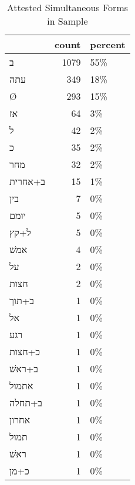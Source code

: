 \begin{table}[htbp!]
\centering
\caption{Attested Simultaneous Forms in Sample}
\label{table:sim_front}
\begin{tabular}{lrl}
\toprule
{} &  count & percent \\
\midrule
\texthebrew{ב}       &   1079 &     55\% \\
\texthebrew{עתה}     &    349 &     18\% \\
\texthebrew{Ø}       &    293 &     15\% \\
\texthebrew{אז}      &     64 &      3\% \\
\texthebrew{ל}       &     42 &      2\% \\
\texthebrew{כ}       &     35 &      2\% \\
\texthebrew{מחר}     &     32 &      2\% \\
\texthebrew{ב+אחרית} &     15 &      1\% \\
\texthebrew{בין}     &      7 &      0\% \\
\texthebrew{יומם}    &      5 &      0\% \\
\texthebrew{ל+קץ}    &      5 &      0\% \\
\texthebrew{אמשׁ}    &      4 &      0\% \\
\texthebrew{על}      &      2 &      0\% \\
\texthebrew{חצות}    &      2 &      0\% \\
\texthebrew{ב+תוך}   &      1 &      0\% \\
\texthebrew{אל}      &      1 &      0\% \\
\texthebrew{רגע}     &      1 &      0\% \\
\texthebrew{כ+חצות}  &      1 &      0\% \\
\texthebrew{ב+ראשׁ}  &      1 &      0\% \\
\texthebrew{אתמול}   &      1 &      0\% \\
\texthebrew{ב+תחלה}  &      1 &      0\% \\
\texthebrew{אחרון}   &      1 &      0\% \\
\texthebrew{תמול}    &      1 &      0\% \\
\texthebrew{ראשׁ}    &      1 &      0\% \\
\texthebrew{כ+מן}    &      1 &      0\% \\
\bottomrule
\end{tabular}
\end{table}
